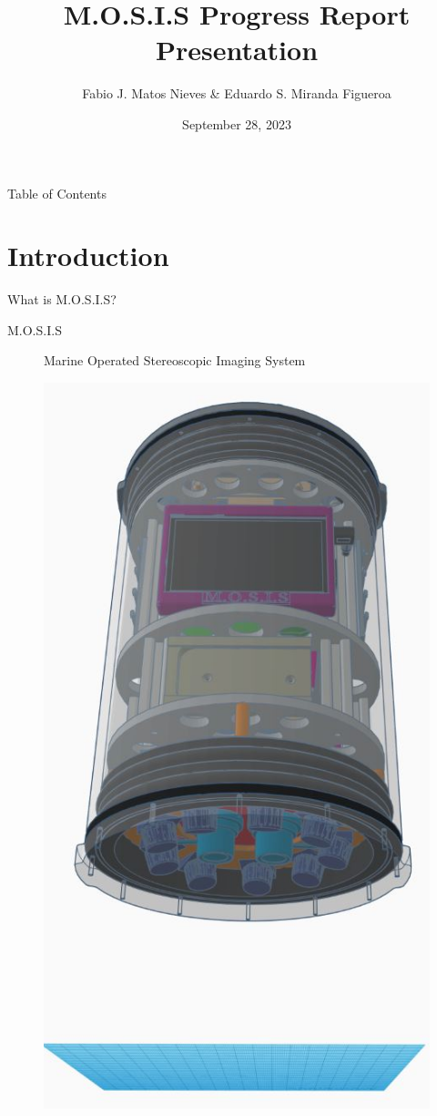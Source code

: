 \documentclass[17pt, aspectratio=169]{beamer}
\title{M.O.S.I.S Progress Report Presentation}
\author[Fabio J. \& Eduardo S.]{Fabio J. Matos Nieves \& Eduardo S. Miranda Figueroa}
\institute[UPRM]{University of Puerto Rico Mayagüez Campus}
\date{September 28, 2023}
\begin{document}
\begin{frame}
	\maketitle
\end{frame}
\begin{frame}{Table of Contents}
	\begin{multicols}{2}
		\begin{spacing}{0.8}
			\tableofcontents
		\end{spacing}
	\end{multicols}
\end{frame}
\section{Introduction}
\begin{frame}{What is M.O.S.I.S?}
\begin{description}
	\item[M.O.S.I.S] Marine Operated Stereoscopic Imaging System
\end{description}	
\begin{figure}
	\includegraphics[height=0.8\textheight]{./Figures/M.O.S.I.S_Model.jpeg}

\end{figure}
\end{frame}
\end{document}
